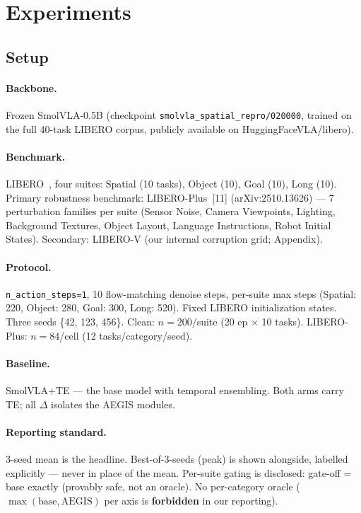 \documentclass[11pt,a4paper]{article}
\begin{document}
\section{Experiments}
\label{sec:experiments}

\subsection{Setup}

\paragraph{Backbone.} Frozen SmolVLA-0.5B (checkpoint \texttt{smolvla\_spatial\_repro/020000},
trained on the full 40-task LIBERO corpus, publicly available on HuggingFaceVLA/libero).

\paragraph{Benchmark.} LIBERO~\cite{libero2023}, four suites: Spatial (10 tasks), Object (10),
Goal (10), Long (10). Primary robustness benchmark: LIBERO-Plus~[11] (arXiv:2510.13626) — 7
perturbation families per suite (Sensor Noise, Camera Viewpoints, Lighting, Background
Textures, Object Layout, Language Instructions, Robot Initial States). Secondary: LIBERO-V
(our internal corruption grid; Appendix).

\paragraph{Protocol.}
\texttt{n\_action\_steps=1}, 10 flow-matching denoise steps, per-suite max steps
(Spatial: 220, Object: 280, Goal: 300, Long: 520). Fixed LIBERO initialization states.
Three seeds \{42, 123, 456\}. Clean: $n=200$/suite (20 ep $\times$ 10 tasks).
LIBERO-Plus: $n=84$/cell (12 tasks/category/seed).

\paragraph{Baseline.}
SmolVLA+TE — the base model with temporal ensembling. Both arms carry TE; all $\Delta$
isolates the AEGIS modules.

\paragraph{Reporting standard.}
3-seed mean is the headline. Best-of-3-seeds (peak) is shown alongside, labelled explicitly
— never in place of the mean. Per-suite gating is disclosed: gate-off = base exactly (provably
safe, not an oracle). No per-category oracle ($\max(\text{base}, \text{AEGIS})$ per axis is
\textbf{forbidden} in our reporting).
\end{document}
